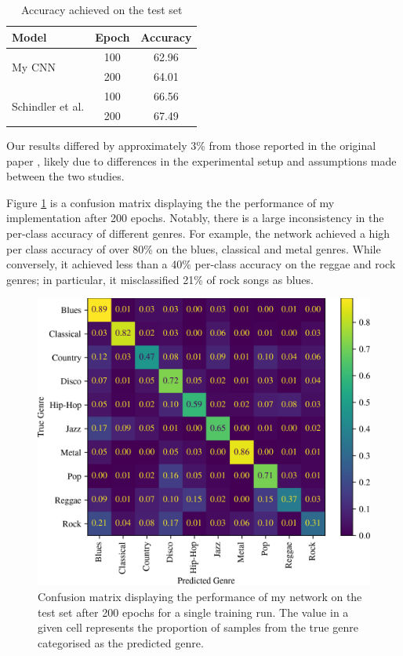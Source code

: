 \documentclass[conference]{IEEEtran}
\begin{document}
\begin{table}[htbp]
    \caption{Accuracy achieved on the test set}
    \begin{center}
    \begin{tabular}{l c c}
    \toprule
    \textbf{Model}&\textbf{Epoch}&\textbf{Accuracy}\\
    \midrule
    \multirow{ 2}{*}{My CNN} & 100 & 62.96 \\
    & 200 & 64.01 \\
    \midrule
    \multirow{ 2}{*}{Schindler et al.} & 100 & 66.56\\
    & 200 & 67.49 \\
    \bottomrule
    \end{tabular}
    \label{shallow_results}
    \end{center}
\end{table}

Our results differed by approximately 3\% from those reported in the original paper \cite{SchindlerLidyRauber}, likely due to differences in the experimental setup and assumptions made between the two studies.

Figure \ref{confusion_matrix} is a confusion matrix displaying the the performance of my implementation after 200 epochs.
Notably, there is a large inconsistency in the per-class accuracy of different genres.
For example, the network achieved a high per class accuracy of over 80\% on the blues, classical and metal genres.
While conversely, it achieved less than a 40\% per-class accuracy on the reggae and rock genres; in particular, it misclassified 21\% of rock songs as blues.

\begin{figure}[htbp]
    \centerline{\includegraphics[width=\columnwidth]{cm.png}}
    \caption{
        Confusion matrix displaying the performance of my network on the test set after 200 epochs for a single training run.    
        The value in a given cell represents the proportion of samples from the true genre categorised as the predicted genre.
    }
    \label{confusion_matrix}
\end{figure}
\end{document}
